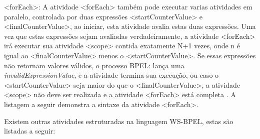 

<forEach>: A atividade <forEach> também pode executar varias atividades em paralelo, controlada por duas expressões <startCounterValue> e <finalCounterValue>, ao iniciar, esta atividade avalia estas duas expressões. Uma vez que estas expressões sejam avaliadas verdadeiramente, a atividade <forEach> irá executar sua atividade <scope> contida exatamente N+1 vezes, onde n é igual ao <finalCounterValue> menos o <startCounterValue>. Se essas expressões não retornam valores válidos, o processo BPEL: lança uma \textit{invalidExpressionValue}, e a atividade termina sua execução, ou caso o <startCounterValue> seja maior do que o <finalCounterValue>, a atividade <scope> não deve ser realizada e a atividade <forEach> está completa \cite{BPEL20}. A listagem a seguir demonstra a sintaxe da atividade <forEach>.



Existem outras atividades estruturadas na linguagem WS-BPEL, estas são listadas a seguir:

